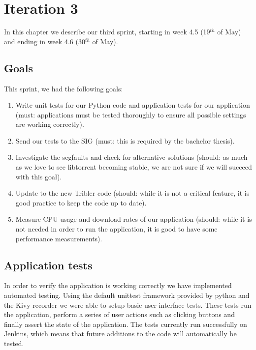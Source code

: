 \chapter{Iteration 3}
\label{iteration3}
	In this chapter we describe our third sprint, starting in week 4.5 (19$^{th}$ of May) and ending in week 4.6 (30$^{th}$ of May).

	\section{Goals}
		This sprint, we had the following goals:
	
		\begin{enumerate}
			\item Write unit tests for our Python code and application tests for our application (must: applications must be tested thoroughly to ensure all possible settings are working correctly). 
			\item Send our tests to the SIG (must: this is required by the bachelor thesis).
			\item Investigate the segfaults and check for alternative solutions (should: as much as we love to see libtorrent becoming stable, we are not sure if we will succeed with this goal).
			\item Update to the new Tribler code (should: while it is not a critical feature, it is good practice to keep the code up to date).
			\item Measure CPU usage and download rates of our application (should: while it is not needed in order to run the application, it is good to have some performance measurements).
		\end{enumerate}
		
	\section{Application tests}
		In order to verify the application is working correctly we have implemented automated testing. Using the default unittest framework provided by python and the Kivy recorder we were able to setup basic user interface tests. These tests run the application, perform a series of user actions such as clicking buttons and finally assert the state of the application. The tests currently run successfully on Jenkins, which means that future additions to the code will automatically be tested.
		
